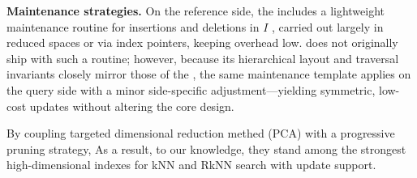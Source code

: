\noindent \textbf{Maintenance strategies.}
On the reference side, the \deltatree includes a lightweight maintenance routine for insertions and deletions in $I$ \cite{cui2003contorting}, carried out largely in reduced spaces or via index pointers, keeping overhead low.
\hdrtree does not originally ship with such a routine; however, because its hierarchical layout and traversal invariants closely mirror those of the \deltatree, the same maintenance template applies on the query side with a minor side-specific adjustment—yielding symmetric, low-cost updates without altering the core design.

By coupling targeted dimensional reduction methed (PCA) with a progressive pruning strategy, 
As a result, to our knowledge, they stand among the strongest high-dimensional indexes for kNN and RkNN search with update support.














